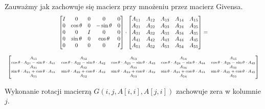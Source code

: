 \documentclass[12pt,a4paper]{report}
\newcommand{\mx}[1]{{#1}}
\begin{document}
\begin{proposition} \label{Proposition-zachowanie-zer}
Zauważmy jak zachowuje się macierz przy mnożeniu przez macierz Givensa.
{
\begin{equation*}
\begin{array}{c}
\begin{bmatrix}
I & 0 & 0 & 0 & 0 \\
0 & \cos\theta & 0 & -\sin\theta & 0 \\
0 & 0 & I & 0 & 0 \\
0 & \sin\theta & 0 & \cos\theta & 0 \\
0 & 0 & 0 & 0 & I
\end{bmatrix} \cdot \begin{bmatrix}
A_{11} & A_{12} & A_{13} & A_{14} & A_{15} \\
A_{21} & A_{22} & A_{23} & A_{24} & A_{25} \\
A_{31} & A_{32} & A_{33} & A_{34} & A_{35} \\
A_{41} & A_{42} & A_{43} & A_{44} & A_{45} \\
A_{51} & A_{52} & A_{53} & A_{54} & A_{55}
\end{bmatrix} = \\ \\
{\scriptsize
\begin{bmatrix}
A_{11} & A_{12} & A_{13} & A_{14} & A_{15} \\
\cos\theta \cdot A_{21} - \sin\theta\cdot A_{41} & \cos\theta \cdot A_{22}- \sin\theta\cdot A_{42} & \cos\theta \cdot A_{23}- \sin\theta\cdot A_{43} & \cos\theta \cdot A_{24}- \sin\theta\cdot A_{44} & \cos\theta \cdot A_{25}- \sin\theta\cdot A_{45} \\
A_{31} & A_{32} & A_{33} & A_{34} & A_{35} \\
\sin\theta\cdot A_{21} + \cos\theta\cdot A_{41} & \sin\theta\cdot A_{22} + \cos\theta\cdot A_{42} & \sin\theta\cdot A_{23} + \cos\theta\cdot A_{43} & \sin\theta\cdot A_{24} + \cos\theta\cdot A_{44} & \sin\theta\cdot A_{25} + \cos\theta\cdot A_{45} \\
A_{51} & A_{52} & A_{53} & A_{54} & A_{55} 
\end{bmatrix}
}
\end{array}
\end{equation*}
}
\end{proposition}

\begin{proposition}\label{Proposition-zera-w-kolumnie}
Wykonanie rotacji macierzą $\mx{G}(i,j, \mx{A}[i,i], \mx{A}[j,i])$ zachowuje zera w kolumnie $j$.
\end{proposition}
\end{document}
